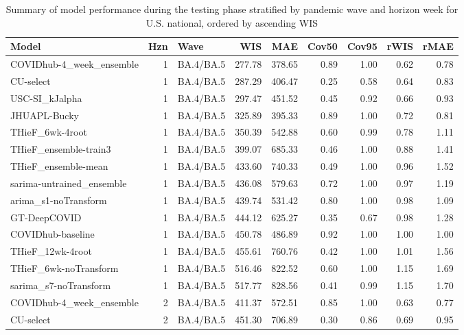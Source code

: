 \documentclass[12pt]{article}
\begin{document}
\begingroup\renewcommand{\arraystretch}{0.75} \setlength{\tabcolsep}{3pt}
\begin{longtable}{lrlrrrrrr}
\caption{Summary of model performance during the testing phase stratified by pandemic wave and horizon week for U.S. national, ordered by ascending WIS} \\ 
  \hline
Model & Hzn & Wave & WIS & MAE & Cov50 & Cov95 & rWIS & rMAE \\ 
  \hline
COVIDhub-4\_week\_ensemble & 1 & BA.4/BA.5 & 277.78 & 378.65 & 0.89 & 1.00 & 0.62 & 0.78 \\ 
  CU-select & 1 & BA.4/BA.5 & 287.29 & 406.47 & 0.25 & 0.58 & 0.64 & 0.83 \\ 
  USC-SI\_kJalpha & 1 & BA.4/BA.5 & 297.47 & 451.52 & 0.45 & 0.92 & 0.66 & 0.93 \\ 
  JHUAPL-Bucky & 1 & BA.4/BA.5 & 325.89 & 395.33 & 0.89 & 1.00 & 0.72 & 0.81 \\ 
  THieF\_6wk-4root & 1 & BA.4/BA.5 & 350.39 & 542.88 & 0.60 & 0.99 & 0.78 & 1.11 \\ 
  THieF\_ensemble-train3 & 1 & BA.4/BA.5 & 399.07 & 685.33 & 0.46 & 1.00 & 0.88 & 1.41 \\ 
  THieF\_ensemble-mean & 1 & BA.4/BA.5 & 433.60 & 740.33 & 0.49 & 1.00 & 0.96 & 1.52 \\ 
  sarima-untrained\_ensemble & 1 & BA.4/BA.5 & 436.08 & 579.63 & 0.72 & 1.00 & 0.97 & 1.19 \\ 
  arima\_s1-noTransform & 1 & BA.4/BA.5 & 439.74 & 531.42 & 0.80 & 1.00 & 0.98 & 1.09 \\ 
  GT-DeepCOVID & 1 & BA.4/BA.5 & 444.12 & 625.27 & 0.35 & 0.67 & 0.98 & 1.28 \\ 
  COVIDhub-baseline & 1 & BA.4/BA.5 & 450.78 & 486.89 & 0.92 & 1.00 & 1.00 & 1.00 \\ 
  THieF\_12wk-4root & 1 & BA.4/BA.5 & 455.61 & 760.76 & 0.42 & 1.00 & 1.01 & 1.56 \\ 
  THieF\_6wk-noTransform & 1 & BA.4/BA.5 & 516.46 & 822.52 & 0.60 & 1.00 & 1.15 & 1.69 \\ 
  sarima\_s7-noTransform & 1 & BA.4/BA.5 & 517.77 & 828.56 & 0.41 & 0.99 & 1.15 & 1.70 \\ 
  COVIDhub-4\_week\_ensemble & 2 & BA.4/BA.5 & 411.37 & 572.51 & 0.85 & 1.00 & 0.63 & 0.77 \\ 
  CU-select & 2 & BA.4/BA.5 & 451.30 & 706.89 & 0.30 & 0.86 & 0.69 & 0.95 \\ 

\end{longtable}
\end{document}
